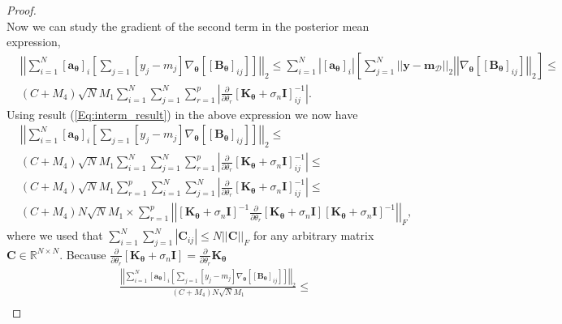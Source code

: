 \documentclass[jair,twoside,11pt,theapa]{article}
\theoremstyle{definition}
\begin{document}
\begin{proof}
\begin{equation}
\end{equation}
Now we can study the gradient of the second term in the posterior mean expression,
\begin{align*}
    &\left|\left|\sum_{i=1}^N[\bm{a}_{\bm{\theta}}]_i\left[\sum_{j=1}[y_j - m_j]\nabla_{\bm{\theta}}\left[[\bm{B}_{\bm{\theta}}]_{ij}\right]\right]\right|\right|_2 \le \nonumber
    \sum_{i=1}^N\left|[\bm{a}_{\bm{\theta}}]_i\right|\left[\sum_{j=1}^N||\bm{y} - \bm{m}_{\mathcal{D}}||_2\left|\left|\nabla_{\bm{\theta}}\left[[\bm{B}_{\bm{\theta}}]_{ij}\right]\right|\right|_2\right] \le\\\nonumber
    &(C+M_4)\sqrt{N}M_1\sum_{i=1}^N\sum_{j=1}^N\sum_{r=1}^p\left|\frac{\partial}{\partial\theta_r}\left[\bm{K}_{\boldsymbol{\theta}} + \sigma_{n}\boldsymbol{I}\right]^{-1}_{ij}\right|.
\end{align*}
Using result (\ref{Eq:interm_result}) in the above expression we now have 
\begin{align*}
    &\left|\left|\sum_{i=1}^N[\bm{a}_{\bm{\theta}}]_i\left[\sum_{j=1}[y_j - m_j]\nabla_{\bm{\theta}}\left[[\bm{B}_{\bm{\theta}}]_{ij}\right]\right]\right|\right|_2 \le \\\nonumber
    &(C+M_4)\sqrt{N}M_1\sum_{i=1}^N\sum_{j=1}^N\sum_{r=1}^p\left|\frac{\partial}{\partial\theta_r}\left[\bm{K}_{\boldsymbol{\theta}} + \sigma_{n}\boldsymbol{I}\right]^{-1}_{ij}\right| \le \\\nonumber
    &(C+M_4)\sqrt{N}M_1\sum_{r=1}^p\sum_{i=1}^N\sum_{j=1}^N\left|\frac{\partial}{\partial\theta_r}\left[\bm{K}_{\boldsymbol{\theta}} + \sigma_{n}\boldsymbol{I}\right]^{-1}_{ij}\right|\le \\\nonumber
    &(C+M_4)N\sqrt{N}M_1\times
    \nonumber
    \sum_{r=1}^p\left|\left|\left[\bm{K}_{\boldsymbol{\theta}} + \sigma_{n}\boldsymbol{I}\right]^{-1}\frac{\partial}{\partial\theta_r}\left[\bm{K}_{\boldsymbol{\theta}} + \sigma_{n}\boldsymbol{I}\right]\left[\bm{K}_{\boldsymbol{\theta}} + \sigma_{n}\boldsymbol{I}\right]^{-1}\right|\right|_F,
\end{align*}
where we used that $\sum_{i=1}^N\sum_{j=1}^N|\boldsymbol{C}_{ij}|\le N||\boldsymbol{C}||_F$ for any arbitrary matrix $\boldsymbol{C}\in\mathbb{R}^{N\times N}$. Because $\frac{\partial}{\partial\theta_r}[\bm{K}_{\boldsymbol{\theta}} + \sigma_{n}\boldsymbol{I}] = \frac{\partial}{\partial\theta_r}\bm{K}_{\boldsymbol{\theta}}$
\begin{align*}
    &\frac{\left|\left|\sum_{i=1}^N[\bm{a}_{\bm{\theta}}]_i\left[\sum_{j=1}[y_j - m_j]\nabla_{\bm{\theta}}\left[[\bm{B}_{\bm{\theta}}]_{ij}\right]\right]\right|\right|_2}{(C+M_4)N\sqrt{N}M_1} \le \\\nonumber

\end{align*}
\end{proof}
\end{document}
